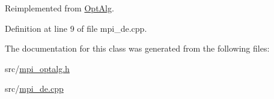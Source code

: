 Reimplemented from \hyperlink{class_opt_alg_a30d9983af0d0eb8125e888e87fd37a99}{Opt\+Alg}.



Definition at line 9 of file mpi\+\_\+de.\+cpp.



The documentation for this class was generated from the following files\+:\begin{DoxyCompactItemize}
\item 
src/\hyperlink{mpi__optalg_8h}{mpi\+\_\+optalg.\+h}\item 
src/\hyperlink{mpi__de_8cpp}{mpi\+\_\+de.\+cpp}\end{DoxyCompactItemize}
